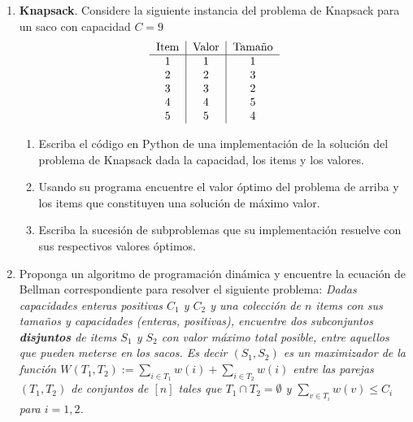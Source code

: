 \documentclass[12pt, a4paper]{article}
\begin{document}
\begin{enumerate}
\item {\bf Knapsack}. Considere la siguiente instancia del problema de Knapsack para un saco con capacidad $C=9$
\[
\begin{tabular}{c|c|c}
Item & Valor & Tama\~no \\
\hline
1 & 1 & 1\\
2 & 2 & 3\\
3 & 3 & 2\\
4 & 4 & 5\\
5 & 5 & 4\\
\end{tabular}
\]
\begin{enumerate}
\item Escriba el c\'odigo en Python de una implementaci\'on de la soluci\'on del problema de Knapsack dada la capacidad, los items y los valores.
\item Usando su programa encuentre el valor \'optimo del problema de arriba y los items que constituyen una soluci\'on de m\'aximo valor. 
\item Escriba la sucesi\'on de subproblemas que su implementaci\'on resuelve con sus respectivos valores \'optimos. 
\end{enumerate}

\item Proponga un algoritmo de programaci\'on din\'amica y encuentre la ecuación de Bellman correspondiente para resolver el siguiente problema: {\it Dadas capacidades enteras positivas $C_1$ y $C_2$ y una colecci\'on de $n$ items con sus tama\~nos y capacidades (enteras, positivas), encuentre dos subconjuntos {\bf disjuntos} de items $S_1$ y $S_2$ con valor m\'aximo total posible, entre aquellos que pueden meterse en los sacos. Es decir $(S_1,S_2)$ es un maximizador de la funci\'on $W(T_1,T_2):=\sum_{i\in T_1}w(i)+\sum_{i\in T_2}w(i)$ 
entre las parejas $(T_1,T_2)$ de conjuntos de $[n]$ tales que $T_1\cap T_2=\emptyset$ y $\sum_{v\in T_i}w(v)\leq C_i$ para $i=1,2$.}

\end{enumerate}
\end{document}
